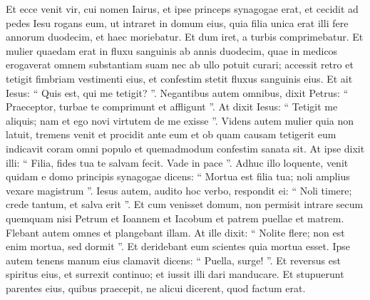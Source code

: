 \begin{biblechapter}
\begin{biblechapter}
\begin{biblechapter}
\begin{biblechapter}
\begin{biblechapter}
\begin{biblechapter}
\begin{biblechapter}
\begin{biblechapter}
\verse Et ecce venit vir, cui nomen Iairus, et ipse princeps synagogae erat, et cecidit ad pedes Iesu rogans eum, ut intraret in domum eius, 
\verse quia filia unica erat illi fere annorum duodecim, et haec moriebatur. Et dum iret, a turbis comprimebatur. 
\verse Et mulier quaedam erat in fluxu sanguinis ab annis duodecim, quae in medicos erogaverat omnem substantiam suam nec ab ullo potuit curari; 
\verse accessit retro et tetigit fimbriam vestimenti eius, et confestim stetit fluxus sanguinis eius. 
\verse Et ait Iesus: “ Quis est, qui me tetigit? ”. Negantibus autem omnibus, dixit Petrus: “ Praeceptor, turbae te comprimunt et affligunt ”. 
\verse At dixit Iesus: “ Tetigit me aliquis; nam et ego novi virtutem de me exisse ”. 
\verse Videns autem mulier quia non latuit, tremens venit et procidit ante eum et ob quam causam tetigerit eum indicavit coram omni populo et quemadmodum confestim sanata sit. 
\verse At ipse dixit illi: “ Filia, fides tua te salvam fecit. Vade in pace ”.
 \verse Adhuc illo loquente, venit quidam e domo principis synagogae dicens: “ Mortua est filia tua; noli amplius vexare magistrum ”. 
\verse Iesus autem, audito hoc verbo, respondit ei: “ Noli timere; crede tantum, et salva erit ”. 
\verse Et cum venisset domum, non permisit intrare secum quemquam nisi Petrum et Ioannem et Iacobum et patrem puellae et matrem. 
\verse Flebant autem omnes et plangebant illam. At ille dixit: “ Nolite flere; non est enim mortua, sed dormit ”. 
\verse Et deridebant eum scientes quia mortua esset. 
\verse Ipse autem tenens manum eius clamavit dicens: “ Puella, surge! ”. 
\verse Et reversus est spiritus eius, et surrexit continuo; et iussit illi dari manducare. 
\verse Et stupuerunt parentes eius, quibus praecepit, ne alicui dicerent, quod factum erat.
 

\end{biblechapter}
\end{biblechapter}
\end{biblechapter}
\end{biblechapter}
\end{biblechapter}
\end{biblechapter}
\end{biblechapter}
\end{biblechapter}
